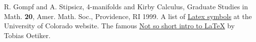 \documentclass{amsart}					%
\theoremstyle{definition}
\begin{document}
\begin{thebibliography}{99} %
R. Gompf and A. Stipsicz, 4-manifolds and Kirby Calculus, Graduate Studies in Math. \textbf{20}, Amer. Math. Soc., Providence, RI 1999. %
A list of \href{http://amath.colorado.edu/documentation/LaTeX/Symbols.pdf}{Latex symbols} at the University of Colorado website.
The famous \href{http://tobi.oetiker.ch/lshort/lshort.pdf}{Not so short intro to \LaTeX} by Tobias Oetiker.
\end{thebibliography}
\end{document}
